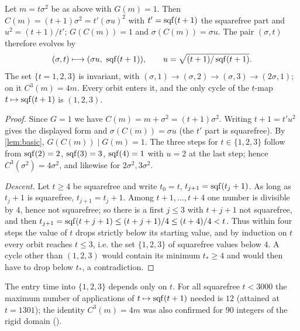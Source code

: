 \begin{theorem}\label{thm:B2T6}
Let $m=t\sigma^2$ be as above with $G(m)=1$. Then $C(m)=(t+1)\sigma^2=t'(\sigma u)^2$ with $t'=\operatorname{sqf}(t+1)$ the squarefree part and $u^2=(t+1)/t'$; $G(C(m))=1$ and $\sigma(C(m))=\sigma u$. The pair $(\sigma,t)$ therefore evolves by
\[
(\sigma,t)\longmapsto(\sigma u,\ \sqf(t+1)),\qquad u=\sqrt{(t+1)/\sqf(t+1)} .
\]
The set $\{t=1,2,3\}$ is invariant, with $(\sigma,1)\to(\sigma,2)\to(\sigma,3)\to(2\sigma,1)$; on it $C^3(m)=4m$. Every orbit enters it, and the only cycle of the $t$-map $t\mapsto\operatorname{sqf}(t+1)$ is $(1,2,3)$.
\end{theorem}
\begin{proof}
Since $G=1$ we have $C(m)=m+\sigma^2=(t+1)\sigma^2$. Writing $t+1=t'u^2$ gives the displayed form and $\sigma(C(m))=\sigma u$ (the $t'$ part is squarefree). By \cref{lem:basic}, $G(C(m))\mid G(m)=1$. The three steps for $t\in\{1,2,3\}$ follow from $\operatorname{sqf}(2)=2$, $\operatorname{sqf}(3)=3$, $\operatorname{sqf}(4)=1$ with $u=2$ at the last step; hence $C^3(\sigma^2)=4\sigma^2$, and likewise for $2\sigma^2,3\sigma^2$.

\emph{Descent.} Let $t\ge4$ be squarefree and write $t_0=t$, $t_{j+1}=\operatorname{sqf}(t_j+1)$. As long as $t_j+1$ is squarefree, $t_{j+1}=t_j+1$. Among $t+1,\dots,t+4$ one number is divisible by $4$, hence not squarefree; so there is a first $j\le3$ with $t+j+1$ not squarefree, and then $t_{j+1}=\operatorname{sqf}(t+j+1)\le(t+j+1)/4\le(t+4)/4<t$. Thus within four steps the value of $t$ drops strictly below its starting value, and by induction on $t$ every orbit reaches $t\le3$, i.e. the set $\{1,2,3\}$ of squarefree values below $4$. A cycle other than $(1,2,3)$ would contain its minimum $t_*\ge4$ and would then have to drop below $t_*$, a contradiction. \qedhere
\end{proof}
\begin{remark}\label{rem:entry}
The entry time into $\{1,2,3\}$ depends only on $t$. For all squarefree $t<3000$ the maximum number of applications of $t\mapsto\operatorname{sqf}(t+1)$ needed is $12$ (attained at $t=1301$); the identity $C^3(m)=4m$ was also confirmed for $90$ integers of the rigid domain ().
\end{remark}

